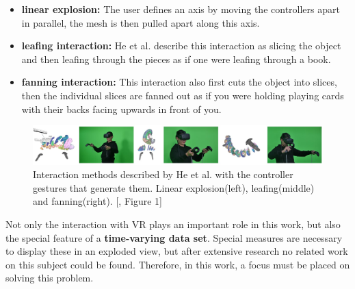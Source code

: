 \begin{itemize}
	\item \textbf{linear explosion:} The user defines an axis by moving the controllers apart in parallel, the mesh is then pulled apart along this axis.
	\item \textbf{leafing interaction:} He et al. describe this interaction as slicing the object and then leafing through the pieces as if one were leafing through a book.
	\item \textbf{fanning interaction:} This interaction also first cuts the object into slices, then the individual slices are fanned out as if you were holding playing cards with their backs facing upwards in front of you. 
\end{itemize}
\begin{figure}[h]
	\centering
	\includegraphics[width=1\linewidth]{fig/Images/He_fig1}
	\caption[]{Interaction methods described by He et al. with the controller gestures that generate them. Linear explosion(left), leafing(middle) and fanning(right). [\cite{He2017}, Figure 1]}
	\label{fig:He_interactions}
\end{figure}
Not only the interaction with VR plays an important role in this work, but also the special feature of a \textbf{time-varying data set}. 
Special measures are necessary to display these in an exploded view, but after extensive research no related work on this subject could be found. 
Therefore, in this work, a focus must be placed on solving this problem.

